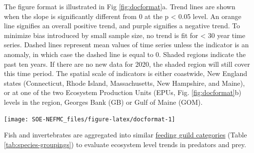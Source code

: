 \documentclass[
  10pt,
]{article}
\let\origfigure\figure
\let\endorigfigure\endfigure
\renewenvironment{figure}[1][2] {
    \expandafter\origfigure\expandafter[H]
} {
    \endorigfigure
}
\begin{document}
The figure format is illustrated in Fig \ref{fig:docformat}a. Trend lines are shown when the slope is significantly different from 0 at the p \textless{} 0.05 level. An orange line signifies an overall positive trend, and purple signifies a negative trend. To minimize bias introduced by small sample size, no trend is fit for \textless{} 30 year time series. Dashed lines represent mean values of time series unless the indicator is an anomaly, in which case the dashed line is equal to 0. Shaded regions indicate the past ten years. If there are no new data for 2020, the shaded region will still cover this time period. The spatial scale of indicators is either coastwide, New England states (Connecticut, Rhode Island, Massachusetts, New Hampshire, and Maine), or at one of the two Ecosystem Production Units (EPUs, Fig. \ref{fig:docformat}b) levels in the region, Georges Bank (GB) or Gulf of Maine (GOM).

\begin{figure}

{\centering \texttt{[image: SOE-NEFMC\_files/figure-latex/docformat-1]} 

}

\caption{Document orientation. a. Key to figures. b.The Northeast Large Marine Ecosystem.}\label{fig:docformat}
\end{figure}

Fish and invertebrates are aggregated into similar \href{https://noaa-edab.github.io/catalog/species_groupings.html}{feeding guild categories} (Table \ref{tab:species-groupings}) to evaluate ecosystem level trends in predators and prey.

\providecommand{\docline}[3]{\noalign{\global\setlength{\arrayrulewidth}{#1}}\arrayrulecolor[HTML]{#2}\cline{#3}}

\setlength{\tabcolsep}{2pt}

\renewcommand*{\arraystretch}{1.5}
\end{document}
